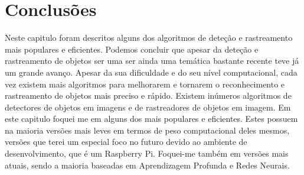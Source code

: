 




\section{Conclusões}
\label{chap2:sec:concs}

Neste capitulo foram descritos alguns dos algoritmos de deteção e rastreamento mais populares e eficientes. Podemos concluir que apesar da deteção e rastreamento de objetos ser uma ser ainda uma temática bastante recente teve já um grande avanço. Apesar da sua dificuldade e do seu nível computacional, cada vez existem mais algoritmos para melhorarem e tornarem o reconhecimento e rastreamento de objetos mais preciso e rápido.
\newline
Existem inúmeros algoritmos de detectores de objetos em imagens e de rastreadores de objetos em imagem. Em este capitulo foquei me em alguns dos mais populares e eficientes. Estes possuem na maioria versões mais leves em termos de peso computacional deles mesmos, versões que terei um especial foco no futuro devido ao ambiente de desenvolvimento, que é um Raspberry Pi. Foquei-me também em versões mais atuais, sendo a maioria baseadas em Aprendizagem Profunda e Redes Neurais.



